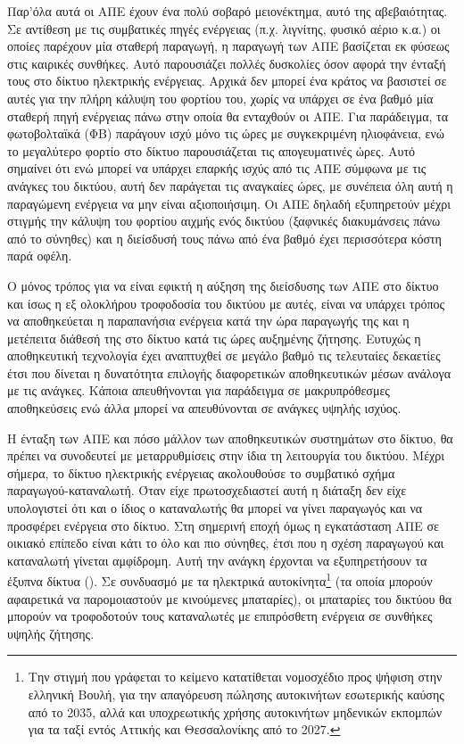 \documentclass[12pt]{report}
\begin{document}
Παρ'όλα αυτά οι ΑΠΕ έχουν ένα πολύ σοβαρό μειονέκτημα, αυτό της αβεβαιότητας. Σε αντίθεση με τις συμβατικές πηγές ενέργειας (π.χ. λιγνίτης, φυσικό αέριο κ.α.) οι οποίες παρέχουν μία σταθερή παραγωγή, η παραγωγή των ΑΠΕ βασίζεται
εκ φύσεως στις καιρικές συνθήκες. Αυτό παρουσιάζει πολλές δυσκολίες όσον αφορά την ένταξή τους στο δίκτυο ηλεκτρικής ενέργειας. Αρχικά δεν μπορεί ένα κράτος να βασιστεί σε αυτές για την πλήρη κάλυψη του φορτίου του, χωρίς να υπάρχει
σε ένα βαθμό μία σταθερή πηγή ενέργειας πάνω στην οποία θα ενταχθούν οι ΑΠΕ. Για παράδειγμα, τα φωτοβολταϊκά (ΦΒ) παράγουν ισχύ μόνο τις ώρες με συγκεκριμένη ηλιοφάνεια, ενώ το μεγαλύτερο φορτίο στο δίκτυο παρουσιάζεται τις
απογευματινές ώρες. Αυτό σημαίνει ότι ενώ μπορεί να υπάρχει επαρκής ισχύς από τις ΑΠΕ σύμφωνα με τις ανάγκες του δικτύου, αυτή δεν παράγεται τις αναγκαίες ώρες, με συνέπεια όλη αυτή η παραγώμενη ενέργεια να μην είναι αξιοποιήσιμη. 
Οι ΑΠΕ δηλαδή εξυπηρετούν μέχρι στιγμής την κάλυψη του φορτίου αιχμής ενός δικτύου (ξαφνικές διακυμάνσεις πάνω από το σύνηθες) και η διείσδυσή τους πάνω από ένα βαθμό έχει περισσότερα κόστη παρά οφέλη. 

Ο μόνος τρόπος για να είναι εφικτή η αύξηση της διείσδυσης των ΑΠΕ στο δίκτυο και ίσως η εξ ολοκλήρου τροφοδοσία του δικτύου με αυτές, είναι να υπάρχει τρόπος να αποθηκεύεται η παραπανήσια ενέργεια κατά την ώρα παραγωγής της και η 
μετέπειτα διάθεσή της στο δίκτυο κατά τις ώρες αυξημένης ζήτησης. Ευτυχώς η αποθηκευτική τεχνολογία έχει αναπτυχθεί σε μεγάλο βαθμό τις τελευταίες δεκαετίες έτσι που δίνεται η δυνατότητα επιλογής διαφορετικών 
αποθηκευτικών μέσων ανάλογα με τις ανάγκες. Κάποια απευθήνονται για παράδειγμα σε μακρυπρόθεσμες αποθηκεύσεις ενώ άλλα μπορεί να απευθύνονται σε ανάγκες υψηλής ισχύος. 

Η ένταξη των ΑΠΕ και πόσο μάλλον των αποθηκευτικών συστημάτων στο δίκτυο, θα πρέπει να συνοδευτεί με μεταρρυθμίσεις στην ίδια τη λειτουργία του δικτύου. Μέχρι σήμερα, το δίκτυο ηλεκτρικής ενέργειας ακολουθούσε το συμβατικό σχήμα 
παραγωγού-καταναλωτή. Όταν είχε πρωτοσχεδιαστεί αυτή η διάταξη δεν είχε υπολογιστεί ότι και ο ίδιος ο καταναλωτής θα μπορεί να γίνει παραγωγός και να προσφέρει ενέργεια στο δίκτυο. Στη σημερινή εποχή όμως η εγκατάσταση ΑΠΕ σε 
οικιακό επίπεδο είναι κάτι το όλο και πιο σύνηθες, έτσι που η σχέση παραγωγού και καταναλωτή γίνεται αμφίδρομη. Αυτή την ανάγκη έρχονται να εξυπηρετήσουν τα έξυπνα δίκτυα ({}). Σε συνδυασμό με τα ηλεκτρικά 
αυτοκίνητα\footnote{Την στιγμή που γράφεται το κείμενο κατατίθεται νομοσχέδιο προς ψήφιση στην ελληνική Βουλή, για την απαγόρευση πώλησης αυτοκινήτων εσωτερικής καύσης από το 2035, αλλά και υποχρεωτικής χρήσης αυτοκινήτων μηδενικών 
εκπομπών για τα ταξί εντός Αττικής και Θεσσαλονίκης από το 2027.} (τα οποία μπορούν αφαιρετικά να παρομοιαστούν με κινούμενες μπαταρίες), οι μπαταρίες του δικτύου θα μπορούν να τροφοδοτούν τους καταναλωτές με επιπρόσθετη ενέργεια σε 
συνθήκες υψηλής ζήτησης.
\end{document}
